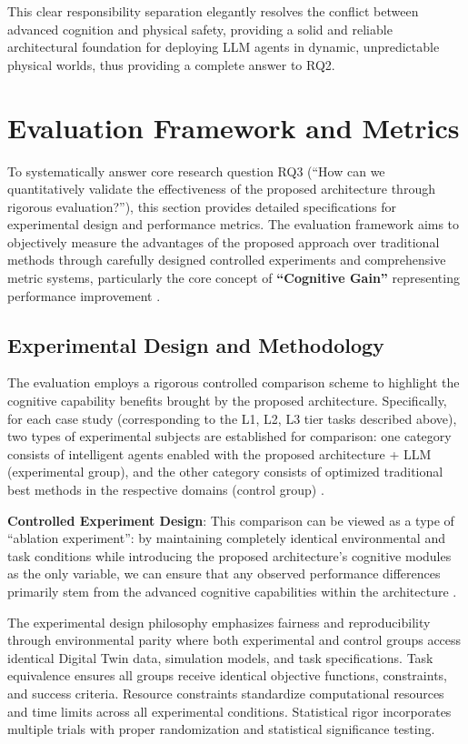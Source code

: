 This clear responsibility separation elegantly resolves the conflict between advanced cognition and physical safety, providing a solid and reliable architectural foundation for deploying LLM agents in dynamic, unpredictable physical worlds, thus providing a complete answer to RQ2.

\section{Evaluation Framework and Metrics}

To systematically answer core research question RQ3 (``How can we quantitatively validate the effectiveness of the proposed architecture through rigorous evaluation?''), this section provides detailed specifications for experimental design and performance metrics. The evaluation framework aims to objectively measure the advantages of the proposed approach over traditional methods through carefully designed controlled experiments and comprehensive metric systems, particularly the core concept of \textbf{``Cognitive Gain''} representing performance improvement \cite{stone2016artificial}.

\subsection{Experimental Design and Methodology}

The evaluation employs a rigorous controlled comparison scheme to highlight the cognitive capability benefits brought by the proposed architecture. Specifically, for each case study (corresponding to the L1, L2, L3 tier tasks described above), two types of experimental subjects are established for comparison: one category consists of intelligent agents enabled with the proposed architecture + LLM (experimental group), and the other category consists of optimized traditional best methods in the respective domains (control group) \cite{duan2022survey}.

\textbf{Controlled Experiment Design}: This comparison can be viewed as a type of ``ablation experiment'': by maintaining completely identical environmental and task conditions while introducing the proposed architecture's cognitive modules as the only variable, we can ensure that any observed performance differences primarily stem from the advanced cognitive capabilities within the architecture \cite{rogers2021primer}.

The experimental design philosophy emphasizes fairness and reproducibility through environmental parity where both experimental and control groups access identical Digital Twin data, simulation models, and task specifications. Task equivalence ensures all groups receive identical objective functions, constraints, and success criteria. Resource constraints standardize computational resources and time limits across all experimental conditions. Statistical rigor incorporates multiple trials with proper randomization and statistical significance testing.

